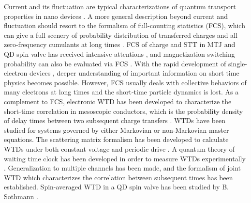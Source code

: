 \documentclass[aps,prb,twocolumn,footinbib,showpacs,superscriptaddress,preprintnumbers,amsmath,amssymb]{revtex4-1}
\begin{document}
	Current and its fluctuation are typical characterizations of quantum transport properties in nano devices \cite{Blanter}. A more general description beyond current and fluctuation should resort to the formalism of full-counting statistics (FCS), which can give a full scenery of probability distribution of transferred charges and all zero-frequency cumulants at long times \cite{Levitov1, Levitov2, Flindt1, wavepacket, Flindt2, Fernando, Flindt3, gm2, JS3, Ruben1, gm3, gm4, gm6, Ruben2, Michael}. FCS of charge and STT in MTJ and QD spin valve has received intensive attentions \cite{FCS-STT, gm2, FCS-MTJ}, and magnetization switching probability can also be evaluated via FCS \cite{switch}. With the rapid development of single-electron devices \cite{SET}, deeper understanding of important information on short time physics becomes possible. However, FCS usually deals with collective behaviors of many electrons at long times and the short-time particle dynamics is lost.
	As a complement to FCS, electronic WTD has been developed to characterize the short-time correlation in mesoscopic conductors, which is the probability density of delay times between two subsequent charge transfers \cite{kampen}. WTDs have been studied for systems governed by either Markovian \cite{WTD_Brandes, WTD_Yan, WTD2011, WTD_rajabi, WTD_spin_valve, WTD_Kosov, WTD_turnstile, WTD_CPS} or non-Markovian \cite{WTD_non-Markovian} master equations. The scattering matrix formalism \cite{wavepacket} has been developed to calculate WTDs under both constant voltage \cite{WTD2012, WTD_TB} and periodic drive \cite{WTD_Floquet, WTD_Leviton, WTD2}. 
A quantum theory of waiting time clock has been developed in order to measure WTDs experimentally \cite{WTD_clock}. Generalization to multiple channels \cite{WTD2014, WTD_correlated} has been made, and the formalism of joint WTD \cite{WTD_correlated} which characterizes the correlation between subsequent times has been established. Spin-averaged WTD in a QD spin valve has been studied by B. Sothmann \cite{WTD_spin_valve}.
\end{document}
